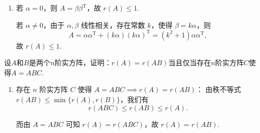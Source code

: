 \begin{exercise}
\begin{exgroup}
\begin{answer}
\begin{enumerate}
                \item 若 $\alpha = 0$，则 $A = \beta \beta^\mathrm{T}$，故 $r(A) \leqslant 1$.

                    若 $\alpha \neq 0$，由于 $\alpha, \beta$ 线性相关，存在常数 $k$，使得 $\beta = k \alpha$，则
                    \[
                        A = \alpha \alpha^\mathrm{T} + (k \alpha)(k \alpha)^\mathrm{T} = (k^2 + 1) \alpha \alpha^\mathrm{T},
                    \]
                    故 $r(A) \leqslant 1$.
            \end{enumerate}
        \end{answer}

        \item 设$A$和$B$是两个$n$阶实方阵，证明：$r(A)=r(AB)$当且仅当存在$n$阶实方阵$C$使得$A=ABC$.
        \begin{answer}
            \begin{enumerate}
                \item 存在 $n$ 阶实方阵 $C$ 使得 $A = ABC \implies r(A) = r(AB)$：
                    由秩不等式 $r(AB) \leqslant \min\{r(A), r(B)\}$，我们有
                    \[
                        r(ABC) \leqslant r(AB) \leqslant r(A).
                    \]

                    而由 $A=ABC$ 可知 $r(A) = r(ABC)$，故 $r(A) = r(AB)$.


\end{enumerate}
\end{answer}
\end{exgroup}
\end{exercise}
